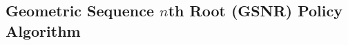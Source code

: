 \subsection{Geometric Sequence $n$th Root (GSNR) Policy Algorithm}
\label{sec:geom-seq-nth-root-algo}

% 

% 

% 
% 
